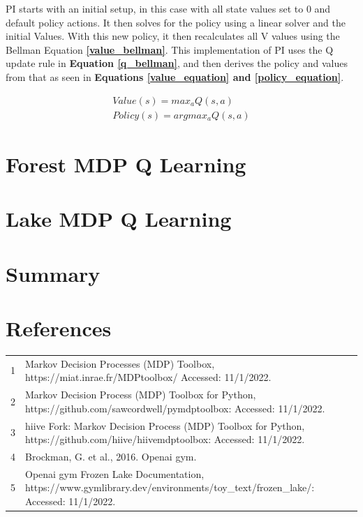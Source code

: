 \documentclass[letterpaper]{article} %
\begin{document}
PI starts with an initial setup, in this case with all state values set to 0 and default policy actions.  It then solves for the policy using a linear solver and the initial Values.  With this new policy, it then recalculates all V values using the Bellman Equation \textbf{\ref{value_bellman}}.  This implementation of PI uses the Q update rule in \textbf{Equation \ref{q_bellman}}, and then derives the policy and values from that as seen in  \textbf{Equations \ref{value_equation} and \ref{policy_equation}}.  



\begin{equation} \label{eq:value_policy}
\begin{gathered}
Value(s) = max_a Q(s,a)\\
Policy(s) = argmax_a Q(s,a)
\end{gathered}
\end{equation}

\section{Forest MDP Q Learning}

\section{Lake MDP Q Learning}

\section{Summary}

\section{References}
\begin{tabular}{l p{2.75in}}
\\
1 & Markov Decision Processes (MDP) Toolbox, https://miat.inrae.fr/MDPtoolbox/ Accessed: 11/1/2022.
\\
2 & Markov Decision Process (MDP) Toolbox for Python, https://github.com/sawcordwell/pymdptoolbox: Accessed: 11/1/2022.
\\
3 & hiive Fork: Markov Decision Process (MDP) Toolbox for Python, https://github.com/hiive/hiivemdptoolbox: Accessed: 11/1/2022.
\\
4 & Brockman, G. et al., 2016. Openai gym.
\\
5 & Openai gym Frozen Lake Documentation,  https://www.gymlibrary.dev/environments/toy\_text/frozen\_lake/: Accessed: 11/1/2022.

\end{tabular}
\end{document}
